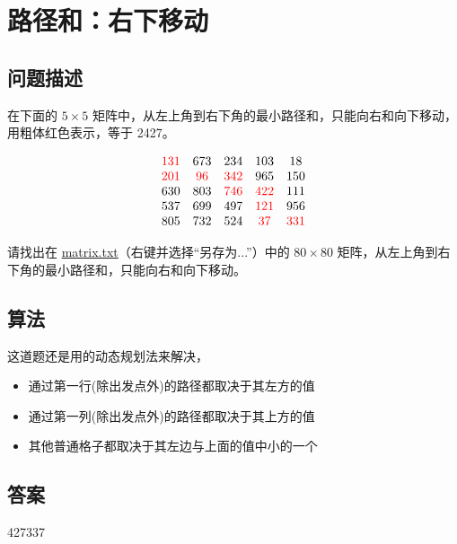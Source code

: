 \section{路径和：右下移动}\label{sec:problem81}
\subsection{问题描述}
\begin{tcolorbox}
	在下面的 $5 \times 5$ 矩阵中，从左上角到右下角的最小路径和，只能向右和向下移动，用粗体红色表示，等于 2427。

	\[
		\begin{array}{ccccc}
			\textcolor{red}{131} & 673      & 234       & 103       & 18        \\
			\textcolor{red}{201} & \textcolor{red}{96} & \textcolor{red}{342} & 965       & 150       \\
			630       & 803      & \textcolor{red}{746} & \textcolor{red}{422} & 111       \\
			537       & 699      & 497       & \textcolor{red}{121} & 956       \\
			805       & 732      & 524       & \textcolor{red}{37}  & \textcolor{red}{331} \\
		\end{array}
	\]

	请找出在 \href{https://projecteuler.net/resources/documents/0081_matrix.txt}{matrix.txt}（右键并选择“另存为...”）中的 $80 \times 80$ 矩阵，从左上角到右下角的最小路径和，只能向右和向下移动。
\end{tcolorbox}

\subsection{算法}
这道题还是用的动态规划法来解决，
\begin{itemize}
	\item 通过第一行(除出发点外)的路径都取决于其左方的值
	\item 通过第一列(除出发点外)的路径都取决于其上方的值
	\item 其他普通格子都取决于其左边与上面的值中小的一个
\end{itemize}

\subsection{答案}
427337
